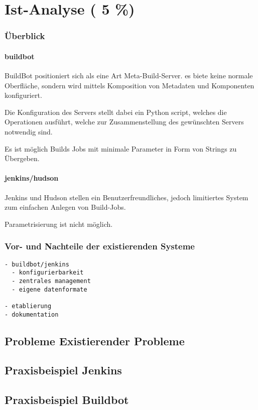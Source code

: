 \chapter{Ist-Analyse ( 5 \%)}

\subsection{Überblick}

\subsubsection{buildbot}

BuildBot positioniert sich als eine Art Meta-Build-Server.
es biete keine normale Oberfläche, sondern wird mittels
Komposition von Metadaten und Komponenten konfiguriert.

Die Konfiguration des Servers stellt dabei ein Python script,
welches die Operationen ausführt, welche zur Zusammenstellung des gewünschten Servers notwendig sind.

Es ist möglich Builds Jobs mit minimale Parameter in Form von Strings zu Übergeben.

\subsubsection{jenkins/hudson}

Jenkins und Hudson stellen ein Benutzerfreundliches,
jedoch limitiertes System zum einfachen Anlegen von Build-Jobs.

Parametrisierung ist nicht möglich.

\subsection{Vor- und Nachteile der existierenden Systeme}

\begin{verbatim}
- buildbot/jenkins
  - konfigurierbarkeit
  - zentrales management
  - eigene datenformate

- etablierung
- dokumentation
\end{verbatim}


\section{Probleme Existierender Probleme}
\section{Praxisbeispiel Jenkins}
\section{Praxisbeispiel Buildbot}


